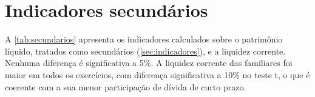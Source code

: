 \chapter{Indicadores secundários}\label{ap:secundarios}

A \autoref{tab:secundarios} apresenta os indicadores calculados sobre o patrimônio
líquido, tratados como secundários (\autoref{sec:indicadores}), e a liquidez
corrente. Nenhuma diferença é significativa a 5\%. A liquidez corrente das
familiares foi maior em todos os exercícios, com diferença significativa a 10\%
no teste t, o que é coerente com a sua menor participação de dívida de curto prazo.


